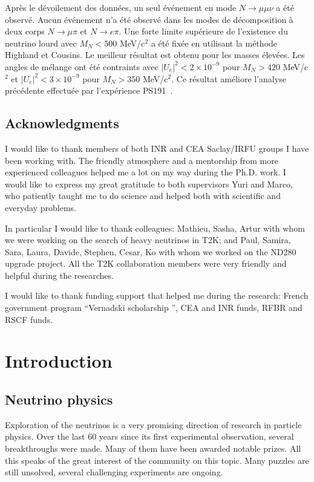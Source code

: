 \documentclass[../main.tex]{subfiles}
\begin{document}
Après le dévoilement des données, un seul événement en mode $N\to\mu\mu\nu$ a été observé. Aucun événement n'a été observé dans les modes de décomposition à deux corps $N\to\mu\pi$ et $N\to e\pi$. Une forte limite supérieure de l'existence du neutrino lourd avec $M_N < 500$ MeV/c${}^2$ a été fixée en utilisant la méthode Highland et Cousins. Le meilleur résultat est obtenu pour les masses élevées. Les angles de mélange ont été contraints avec $\left|U_e\right|^2 < 2\times10^{-9}$ pour $M_N > 420$ MeV/c${}^2$ et $\left|U_e\right|^2 < 3\times10^{-9}$ pour $M_N > 350$ MeV/c${}^2$. Ce résultat améliore l'analyse précédente effectuée par l'expérience PS191~\cite{Abe2019l}.


\chapter*{Acknowledgments}

I would like to thank members of both INR and CEA Saclay/IRFU groups I have been working with. The friendly atmosphere and a mentorship from more experienced colleagues helped me a lot on my way during the Ph.D. work. I would like to express my great gratitude to both supervisors Yuri and Marco, who patiently taught me to do science and helped both with scientific and everyday problems.

In particular I would like to thank colleagues: Mathieu, Sasha, Artur with whom we were working on the search of heavy neutrinos in T2K; and Paul, Samira, Sara, Laura, Davide, Stephen, Cesar, Ko with whom we worked on the ND280 upgrade project. All the T2K collaboration members were very friendly and helpful during the researches.

I would like to thank funding support that helped me during the research: French government program ``Vernadski scholarship '', CEA and INR funds, RFBR and RSCF funds.


\part{Introduction}
\label{part:intro:general}

\chapter{Neutrino physics}
\label{ch:nu_phys}
Exploration of the neutrinos is a very promising direction of research in particle physics. Over the last 60 years since its first experimental observation, several breakthroughs were made. Many of them have been awarded notable prizes. All this speaks of the great interest of the community on this topic. Many puzzles are still unsolved, several challenging experiments are ongoing.
\end{document}
